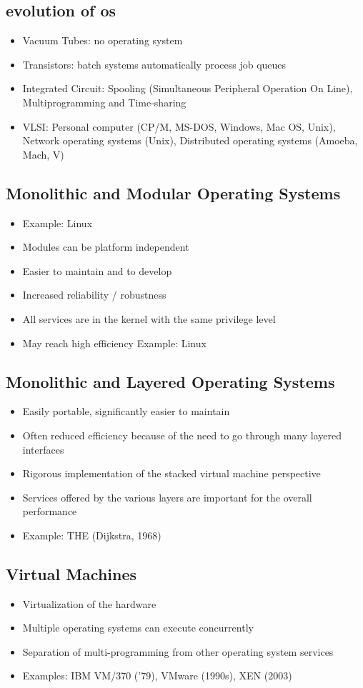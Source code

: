 \documentclass[11pt]{article}
\begin{document}
\subsection{evolution of os}
\label{sec:orgb38d012}
\begin{itemize}
\item Vacuum Tubes: no operating system
\item Transistors: batch systems automatically process job queues
\item Integrated Circuit: Spooling (Simultaneous Peripheral Operation On Line), Multiprogramming and Time-sharing
\item VLSI: Personal computer (CP/M, MS-DOS, Windows, Mac OS, Unix), Network operating systems (Unix), Distributed operating systems (Amoeba, Mach, V)
\end{itemize}
\subsection{Monolithic and Modular Operating Systems}
\label{sec:orgede1d68}
\begin{itemize}
\item Example: Linux
\item Modules can be platform independent
\item Easier to maintain and to develop
\item Increased reliability / robustness
\item All services are in the kernel with the same privilege level
\item May reach high efficiency Example: Linux
\end{itemize}
\subsection{Monolithic and Layered Operating Systems}
\label{sec:org87d9aec}
\begin{itemize}
\item Easily portable, significantly easier to maintain
\item Often reduced efficiency because of the need to go through many layered interfaces
\item Rigorous implementation of the stacked virtual machine perspective
\item Services offered by the various layers are important for the overall performance
\item Example: THE (Dijkstra, 1968)
\end{itemize}
\subsection{Virtual Machines}
\label{sec:orgb37e637}
\begin{itemize}
\item Virtualization of the hardware
\item Multiple operating systems can execute concurrently
\item Separation of multi-programming from other operating system services
\item Examples: IBM VM/370 (’79), VMware (1990s), XEN (2003)
\end{itemize}
\end{document}
